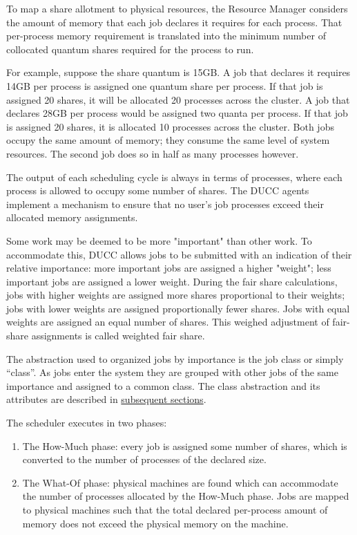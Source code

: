     To map a share allotment to physical resources, the Resource Manager considers the amount of 
    memory that each job declares it requires for each process. That per-process memory requirement 
    is translated into the minimum number of collocated quantum shares required for the process to 
    run. 
    
    For example, suppose the share quantum is 15GB. A job that declares it requires 14GB per process 
    is assigned one quantum share per process. If that job is assigned 20 shares, it will be allocated 20 
    processes across the cluster. A job that declares 28GB per process would be assigned two quanta 
    per process. If that job is assigned 20 shares, it is allocated 10 processes across the cluster. Both     
    jobs occupy the same amount of memory; they consume the same level of system resources. The 
    second job does so in half as many processes however. 
    
    The output of each scheduling cycle is always in terms of processes, where each process is allowed 
    to occupy some number of shares. The DUCC agents implement a mechanism to ensure that no 
    user's job processes exceed their allocated memory assignments. 
    
    Some work may be deemed to be more "important" than other work. To accommodate this, DUCC 
    allows jobs to be submitted with an indication of their relative importance: more important jobs are 
    assigned a higher "weight"; less important jobs are assigned a lower weight. During the fair share 
    calculations, jobs with higher weights are assigned more shares proportional to their weights; jobs 
    with lower weights are assigned proportionally fewer shares. Jobs with equal weights are assigned 
    an equal number of shares. This weighed adjustment of fair-share assignments is called weighted 
    fair share. 
    
    The abstraction used to organized jobs by importance is the job class or simply ``class''. As jobs enter 
    the system they are grouped with other jobs of the same importance and assigned to a common 
    class. The class abstraction and its attributes are described in \hyperref[sec:rm.job-classes]{subsequent sections}. 
    
    The scheduler executes in two phases: 
    \begin{enumerate}
        \item The How-Much phase: every job is assigned some number of shares, which is converted to the
          number of processes of the declared size.
        \item The What-Of phase: physical machines are found which can accommodate the number of
          processes allocated by the How-Much phase. Jobs are mapped to physical machines such that
          the total declared per-process amount of memory does not exceed the physical memory on the
          machine.  
    \end{enumerate}
      
